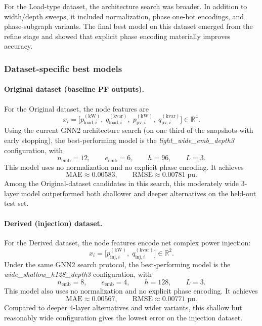 \documentclass[11pt]{article}
\begin{document}
For the Load-type dataset, the architecture search was broader. In addition to width/depth sweeps, it included normalization, phase one-hot encodings, and phase-subgraph variants. The final best model on this dataset emerged from the refine stage and showed that explicit phase encoding materially improves accuracy.

\subsubsection*{Dataset-specific best models}

\paragraph{Original dataset (baseline PF outputs).}
For the Original dataset, the node features are
\[
x_i =
\big[
p_{\text{load},i}^{(\mathrm{kW})},
\;
q_{\text{load},i}^{(\mathrm{kvar})},
\;
p_{\text{pv},i}^{(\mathrm{kW})},
\;
q_{\text{pv},i}^{(\mathrm{kvar})}
\big]
\in \mathbb{R}^{4}.
\]
Using the current GNN2 architecture search (on one third of the snapshots with early stopping), the best-performing model is the \emph{light\_wide\_emb\_depth3} configuration, with
\[
n_{\text{emb}} = 12,\qquad
e_{\text{emb}} = 6,\qquad
h = 96,\qquad
L = 3.
\]
This model uses no normalization and no explicit phase encoding. It achieves
\[
\mathrm{MAE} \approx 0.00583,
\qquad
\mathrm{RMSE} \approx 0.00781\;\text{pu}.
\]
Among the Original-dataset candidates in this search, this moderately wide 3-layer model outperformed both shallower and deeper alternatives on the held-out test set.

\paragraph{Derived (injection) dataset.}
For the Derived dataset, the node features encode net complex power injection:
\[
x_i =
\big[
p_{\text{inj},i}^{(\mathrm{kW})},
\;
q_{\text{inj},i}^{(\mathrm{kvar})}
\big]
\in \mathbb{R}^{2}.
\]
Under the same GNN2 search protocol, the best-performing model is the \emph{wide\_shallow\_h128\_depth3} configuration, with
\[
n_{\text{emb}} = 8,\qquad
e_{\text{emb}} = 4,\qquad
h = 128,\qquad
L = 3.
\]
This model also uses no normalization and no explicit phase encoding. It achieves
\[
\mathrm{MAE} \approx 0.00567,
\qquad
\mathrm{RMSE} \approx 0.00771\;\text{pu}.
\]
Compared to deeper 4-layer alternatives and wider variants, this shallow but reasonably wide configuration gives the lowest error on the injection dataset.
\end{document}
